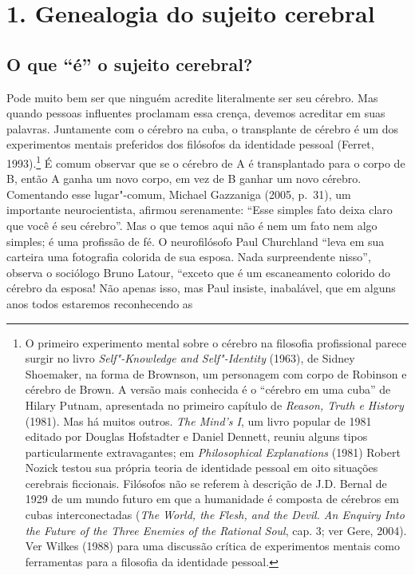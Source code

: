 \chapter{1. Genealogia do sujeito cerebral}

\section{O que ``é'' o sujeito cerebral?}

Pode muito bem ser que ninguém acredite literalmente ser seu cérebro.
Mas quando pessoas influentes proclamam essa crença, devemos acreditar
em suas palavras. Juntamente com o cérebro na cuba, o transplante de
cérebro é um dos experimentos mentais preferidos dos filósofos da
identidade pessoal (Ferret, 1993).\footnote[1]{O primeiro experimento mental sobre o cérebro na filosofia
profissional parece surgir no livro \emph{Self"-Knowledge and
Self"-Identity} (1963), de Sidney Shoemaker, na forma de Brownson, um
personagem com corpo de Robinson e cérebro de Brown. A versão mais
conhecida é o ``cérebro em uma cuba'' de Hilary Putnam, apresentada no
primeiro capítulo de \emph{Reason, Truth e History} (1981). Mas há
muitos outros. \emph{The Mind's I}, um livro popular de 1981 editado por
Douglas Hofstadter e Daniel Dennett, reuniu alguns tipos particularmente
extravagantes; em \emph{Philosophical Explanations} (1981) Robert Nozick
testou sua própria teoria de identidade pessoal em oito situações
cerebrais ficcionais. Filósofos não se referem à descrição de J.D.
Bernal de 1929 de um mundo futuro em que a humanidade é composta de
cérebros em cubas interconectadas (\emph{The World, the Flesh, and the
Devil. An Enquiry Into the Future of the Three Enemies of the Rational
Soul}, cap. 3; ver Gere, 2004). Ver Wilkes (1988) para uma discussão
crítica de experimentos mentais como ferramentas para a filosofia da
identidade pessoal.} É comum observar
que se o cérebro de A é transplantado para o corpo de B, então A ganha
um novo corpo, em vez de B ganhar um novo cérebro. Comentando esse
lugar"-comum, Michael Gazzaniga (2005, p.~31), um importante
neurocientista, afirmou serenamente: ``Esse simples fato deixa claro que
você é seu cérebro''. Mas o que temos aqui não é nem um fato nem algo
simples; é uma profissão de fé. O neurofilósofo Paul Churchland ``leva
em sua carteira uma fotografia colorida de sua esposa. Nada
surpreendente nisso'', observa o sociólogo Bruno Latour, ``exceto que é
um escaneamento colorido do cérebro da esposa! Não apenas isso, mas Paul
insiste, inabalável, que em alguns anos todos estaremos reconhecendo as
